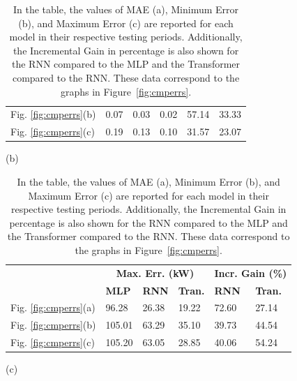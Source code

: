 \begin{table}[H]
\begin{subfigure}{\textwidth}
\begin{tabular}{l|l|l|l|l|l}
			Fig. \ref{fig:cmperrs}(b) & 0.07                                         & 0.03         & 0.02           & 57.14        & 33.33          \\
			Fig. \ref{fig:cmperrs}(c) & 0.19                                         & 0.13         & 0.10           & 31.57        & 23.07
		\end{tabular}
		\caption*{(b)}
	\end{subfigure}
	\begin{subfigure}{\textwidth}
		\centering
		\begin{tabular}{l|l|l|l|l|l}
			                          & \multicolumn{3}{c|}{\textbf{Max. Err. (kW)}}
			                          & \multicolumn{2}{c}{\textbf{Incr. Gain (\%)}}                                                                 \\
			\cline{2-6}
			                          & \textbf{MLP}                                 & \textbf{RNN} & \textbf{Tran.} & \textbf{RNN} & \textbf{Tran.} \\
			\hline
			Fig. \ref{fig:cmperrs}(a) & 96.28                                        & 26.38        & 19.22          & 72.60        & 27.14          \\
			Fig. \ref{fig:cmperrs}(b) & 105.01                                       & 63.29        & 35.10          & 39.73        & 44.54          \\
			Fig. \ref{fig:cmperrs}(c) & 105.20                                       & 63.05        & 28.85          & 40.06        & 54.24
		\end{tabular}
		\caption*{(c)}
	\end{subfigure}
	\caption{In the table, the values of MAE (a), Minimum Error (b), and Maximum Error (c) are reported for each model in their respective testing periods. Additionally, the Incremental Gain in percentage is also shown for the RNN compared to the MLP and the Transformer compared to the RNN. These data correspond to the graphs in Figure~\ref{fig:cmperrs}.}
	\label{tab:cmperrtab}
\end{table}

